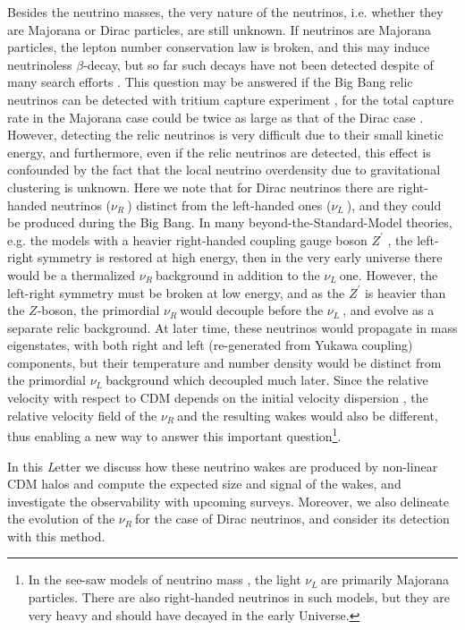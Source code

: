 \documentclass[aps,prl,twocolumn,showpacs,superscriptaddress,groupedaddress,nofootinbib]{revtex4}  %
\newcommand{\nur}{\ensuremath{{\nu_R~}}}
\newcommand{\nul}{\ensuremath{{\nu_L~}}}
\begin{document}
Besides the neutrino masses, the very nature of the neutrinos, i.e. whether
they are Majorana or Dirac particles, are still unknown.
If neutrinos are Majorana particles,
the lepton number conservation law is broken, and this may induce neutrinoless
$\beta$-decay, but so far such decays have not been detected despite of many
search efforts \cite{2013arXiv1310.4340D}. 
This question may be answered if the Big Bang relic neutrinos can be detected
with tritium capture experiment \cite{2013arXiv1307.4738B}, for
the total capture rate in the Majorana case could be twice 
as large as that of the Dirac case \cite{2014JCAP...08..038L}. 
However, detecting the relic neutrinos is very difficult due to their small kinetic energy, 
and furthermore, even if the relic neutrinos are detected, this effect is confounded by the fact that
the local neutrino overdensity due to gravitational clustering is unknown. 
Here we note that for Dirac neutrinos there are 
right-handed neutrinos (\nur) distinct from the left-handed ones (\nul), and
they could be produced during the Big Bang. In many beyond-the-Standard-Model 
theories, e.g. the models with a heavier right-handed coupling gauge boson $Z^\prime$ \cite{2009RvMP...81.1199L}, 
the left-right symmetry is restored at high energy, then in the very early universe there would be 
a thermalized \nur background in addition to the \nul  one. However, the left-right 
symmetry must be broken at low energy, and as the $Z^\prime$  is heavier than the $Z$-boson,
the primordial \nur  would decouple before the \nul, and evolve as a
separate relic background. At later time, these neutrinos
would propagate in mass eigenstates, with both right
and left (re-generated from Yukawa coupling) components, 
but their temperature and number density would be 
distinct from the primordial \nul background which decoupled much later. 
Since the relative velocity with respect to CDM depends on the initial velocity
dispersion \cite{Zhu:2013},  
the relative velocity field of the \nur and 
the resulting wakes  would also be different, thus enabling a new
way to answer this important question\footnote{In the see-saw models 
of neutrino mass \cite{2008IJMPA..23.4255X}, 
the light \nul are primarily Majorana particles. 
There are also right-handed neutrinos in such models, but they 
are very heavy and should have decayed in the early Universe.}.

In this {\emph Letter} we discuss how these neutrino wakes are produced by
non-linear CDM halos and compute the expected size and signal of the
wakes, and investigate the observability with upcoming surveys. 
Moreover, we also delineate the evolution of the \nur for the 
case of Dirac neutrinos, and consider its detection with this method.
\end{document}

